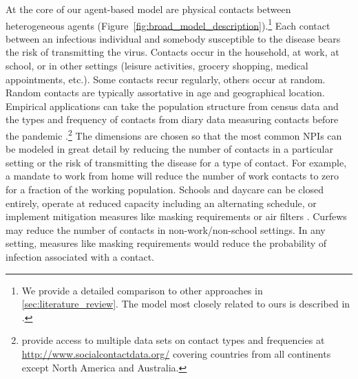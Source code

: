 At the core of our agent-based model are physical contacts between heterogeneous agents
(Figure~\ref{fig:broad_model_description}).\footnote{We provide a detailed comparison to
other approaches in \ref{sec:literature_review}. The model most closely related to ours
is described in \citet{Hinch2020}.} Each contact between an infectious individual and
somebody susceptible to the disease bears the risk of transmitting the virus. Contacts
occur in the household, at work, at school, or in other settings (leisure activities,
grocery shopping, medical appointments, etc.). Some contacts recur regularly, others occur at random. Random contacts are
typically assortative in age and geographical location. Empirical applications can take
the population structure from census data and the types and frequency of contacts from
diary data measuring contacts before the pandemic
\citep[e.g.][]{Mossong2008}.\footnote{\citet{Hoang2019} provide access to multiple data
sets on contact types and frequencies at \url{http://www.socialcontactdata.org/}
covering countries from all continents except North America and Australia.} The
dimensions are chosen so that the most common NPIs can be modeled in great detail by
reducing the number of contacts in a particular setting or the risk of transmitting the
disease for a type of contact. For example, a mandate to work from home will reduce the
number of work contacts to zero for a fraction of the working population. Schools and
daycare can be closed entirely, operate at reduced capacity including an alternating
schedule, or implement mitigation measures like masking requirements or air filters
\citep{Lessler2021}. Curfews may reduce the number of contacts in non-work/non-school
settings. In any setting, measures like masking requirements would reduce the
probability of infection associated with a contact.

